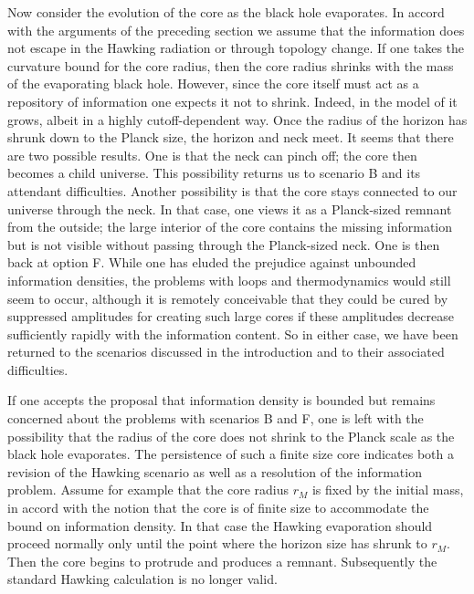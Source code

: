 Now consider the evolution of the core as the black hole evaporates.
In accord with the arguments of the preceding section we assume that the
information does not escape in the Hawking radiation or through topology
change.  If one takes the curvature bound for the core radius, then the
core radius shrinks with the mass of the evaporating black hole.
However, since the core itself
must act as a repository of information one expects
it not to shrink. Indeed, in the model of  it grows, albeit in
a highly cutoff-dependent way.  Once the radius of the horizon has shrunk
down to the Planck size, the horizon and neck meet.  It seems that there
are two possible results.
One is that the neck can pinch off; the core
then becomes a child universe.  This possibility returns us to scenario B
and its attendant difficulties.  Another possibility is that the core stays
connected to our universe through the neck.  In that case, one views it as
a Planck-sized remnant from the outside; the large interior of the core
contains the missing information but is not visible without passing
through the Planck-sized neck.  One is then back at option F.  While one
has eluded the prejudice against unbounded information densities, the
problems with loops and thermodynamics would still seem to
occur, although it is
remotely conceivable that they could be cured by suppressed
amplitudes for creating such large cores if these
amplitudes decrease sufficiently
rapidly  with the
information content.  So in either case, we have been returned to the
scenarios discussed in the introduction and to their associated difficulties.

\itemskip
If one accepts the proposal that information density is bounded but remains
concerned about the problems with scenarios B and F, one is left with the
possibility that the radius of the core does not shrink to the Planck scale
as the black hole evaporates.  The persistence of such a finite size core
indicates both a revision of the Hawking scenario as well as a
resolution of the information problem.  Assume for example that the core
radius $r_M$
is fixed by the initial mass, in accord with the notion that the
core is of finite size to accommodate the bound on information
density.  In that case the Hawking evaporation should proceed
normally only until the point where the horizon size has shrunk to
$r_M$.  Then the core begins to protrude and produces a remnant.
Subsequently the standard
Hawking
calculation is no longer valid.

